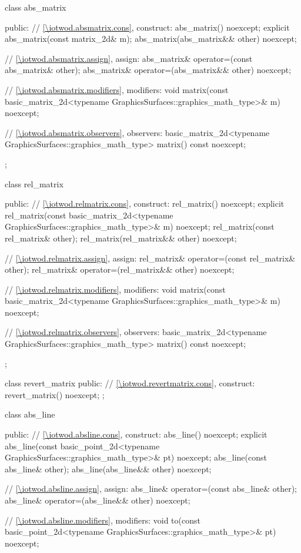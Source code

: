 \begin{codeblock}
{{    class abs_matrix {
	public:
      // \ref{\iotwod.absmatrix.cons}, construct:
      abs_matrix() noexcept;
      explicit abs_matrix(const matrix_2d& m);
      abs_matrix(abs_matrix&& other) noexcept;

      // \ref{\iotwod.absmatrix.assign}, assign:
      abs_matrix& operator=(const abs_matrix& other);
      abs_matrix& operator=(abs_matrix&& other) noexcept;
	
      // \ref{\iotwod.absmatrix.modifiers}, modifiers:
      void matrix(const basic_matrix_2d<typename
        GraphicsSurfaces::graphics_math_type>& m) noexcept;
	
      // \ref{\iotwod.absmatrix.observers}, observers:
      basic_matrix_2d<typename GraphicsSurfaces::graphics_math_type> matrix() const noexcept;
    };

    class rel_matrix {
    public:
      // \ref{\iotwod.relmatrix.cons}, construct:
      rel_matrix() noexcept;
      explicit rel_matrix(const basic_matrix_2d<typename
        GraphicsSurfaces::graphics_math_type>& m) noexcept;
      rel_matrix(const rel_matrix& other);
      rel_matrix(rel_matrix&& other) noexcept;

      // \ref{\iotwod.relmatrix.assign}, assign:
      rel_matrix& operator=(const rel_matrix& other);
      rel_matrix& operator=(rel_matrix&& other) noexcept;

      // \ref{\iotwod.relmatrix.modifiers}, modifiers:
      void matrix(const basic_matrix_2d<typename
        GraphicsSurfaces::graphics_math_type>& m) noexcept;
	
      // \ref{\iotwod.relmatrix.observers}, observers:
      basic_matrix_2d<typename GraphicsSurfaces::graphics_math_type> matrix() const noexcept;
    };

    class revert_matrix {
    public:
      // \ref{\iotwod.revertmatrix.cons}, construct:
      revert_matrix() noexcept;
    };

    class abs_line {
    public:
      // \ref{\iotwod.absline.cons}, construct:
      abs_line() noexcept;
      explicit abs_line(const basic_point_2d<typename
        GraphicsSurfaces::graphics_math_type>& pt) noexcept;
      abs_line(const abs_line& other);
      abs_line(abs_line&& other) noexcept;

      // \ref{\iotwod.absline.assign}, assign:
      abs_line& operator=(const abs_line& other);
      abs_line& operator=(abs_line&& other) noexcept;

      // \ref{\iotwod.absline.modifiers}, modifiers:
      void to(const basic_point_2d<typename GraphicsSurfaces::graphics_math_type>& pt) noexcept;

}}}
\end{codeblock}
